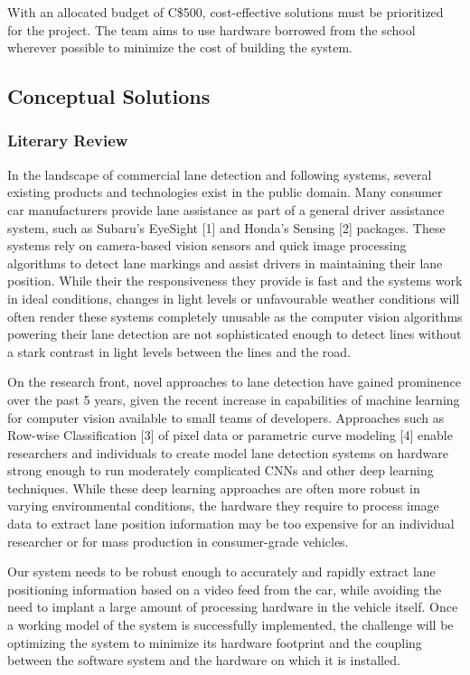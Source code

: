 \documentclass[titlepage]{article}
\begin{document}
With an allocated budget of C\$500, cost-effective solutions must be prioritized for the project. The team aims to use hardware borrowed from the school wherever possible to minimize the cost of building the system.

\subsection{Conceptual Solutions}

\subsubsection{Literary Review}

In the landscape of commercial lane detection and following systems, several existing products and technologies exist in the public domain. Many consumer car manufacturers provide lane assistance as part of a general driver assistance system, such as Subaru’s EyeSight [1] and Honda’s Sensing [2] packages. These systems rely on camera-based vision sensors and quick image processing algorithms to detect lane markings and assist drivers in maintaining their lane position. While their the responsiveness they provide is fast and the systems work in ideal conditions, changes in light levels or unfavourable weather conditions will often render these systems completely unusable as the computer vision algorithms powering their lane detection are not sophisticated enough to detect lines without a stark contrast in light levels between the lines and the road.


On the research front, novel approaches to lane detection have gained prominence over the past 5 years, given the recent increase in capabilities of machine learning for computer vision available to small teams of developers. Approaches such as Row-wise Classification [3] of pixel data or parametric curve modeling [4] enable researchers and individuals to create model lane detection systems on hardware strong enough to run moderately complicated CNNs and other deep learning techniques. While these deep learning approaches are often more robust in varying environmental conditions, the hardware they require to process image data to extract lane position information may be too expensive for an individual researcher or for mass production in consumer-grade vehicles.

Our system needs to be robust enough to accurately and rapidly extract lane positioning information based on a video feed from the car, while avoiding the need to implant a large amount of processing hardware in the vehicle itself. Once a working model of the system is successfully implemented, the challenge will be optimizing the system to minimize its hardware footprint and the coupling between the software system and the hardware on which it is installed.
\end{document}
